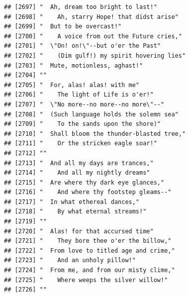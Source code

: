 \documentclass{article}\usepackage[]{graphicx}\usepackage[]{color}
\makeatletter
\newenvironment{kframe}{%
 \def\at@end@of@kframe{}%
 \ifinner\ifhmode%
  \def\at@end@of@kframe{\end{minipage}}%
  \begin{minipage}{\columnwidth}%
 \fi\fi%
 \def\FrameCommand##1{\hskip\@totalleftmargin \hskip-\fboxsep
 \colorbox{shadecolor}{##1}\hskip-\fboxsep
     \hskip-\linewidth \hskip-\@totalleftmargin \hskip\columnwidth}%
 \MakeFramed {\advance\hsize-\width
   \@totalleftmargin\z@ \linewidth\hsize
   \@setminipage}}%
 {\par\unskip\endMakeFramed%
 \at@end@of@kframe}
\newenvironment{knitrout}{}{} %
\makeatother
\begin{document}
\begin{knitrout}
\begin{kframe}
\begin{verbatim}
## [2697] "  Ah, dream too bright to last!"                                             
## [2698] "    Ah, starry Hope! that didst arise"                                       
## [2699] "  But to be overcast!"                                                       
## [2700] "    A voice from out the Future cries,"                                      
## [2701] "  \"On! on!\"--but o'er the Past"                                            
## [2702] "    (Dim gulf!) my spirit hovering lies"                                     
## [2703] "  Mute, motionless, aghast!"                                                 
## [2704] ""                                                                            
## [2705] "  For, alas! alas! with me"                                                  
## [2706] "    The light of Life is o'er!"                                              
## [2707] "  \"No more--no more--no more\"--"                                           
## [2708] "  (Such language holds the solemn sea"                                       
## [2709] "    To the sands upon the shore)"                                            
## [2710] "  Shall bloom the thunder-blasted tree,"                                     
## [2711] "    Or the stricken eagle soar!"                                             
## [2712] ""                                                                            
## [2713] "  And all my days are trances,"                                              
## [2714] "    And all my nightly dreams"                                               
## [2715] "  Are where thy dark eye glances,"                                           
## [2716] "    And where thy footstep gleams--"                                         
## [2717] "  In what ethereal dances,"                                                  
## [2718] "    By what eternal streams!"                                                
## [2719] ""                                                                            
## [2720] "  Alas! for that accursed time"                                              
## [2721] "    They bore thee o'er the billow,"                                         
## [2722] "  From love to titled age and crime,"                                        
## [2723] "    And an unholy pillow!"                                                   
## [2724] "  From me, and from our misty clime,"                                        
## [2725] "    Where weeps the silver willow!"                                          
## [2726] ""                                                                            

\end{verbatim}
\end{kframe}
\end{knitrout}
\end{document}
